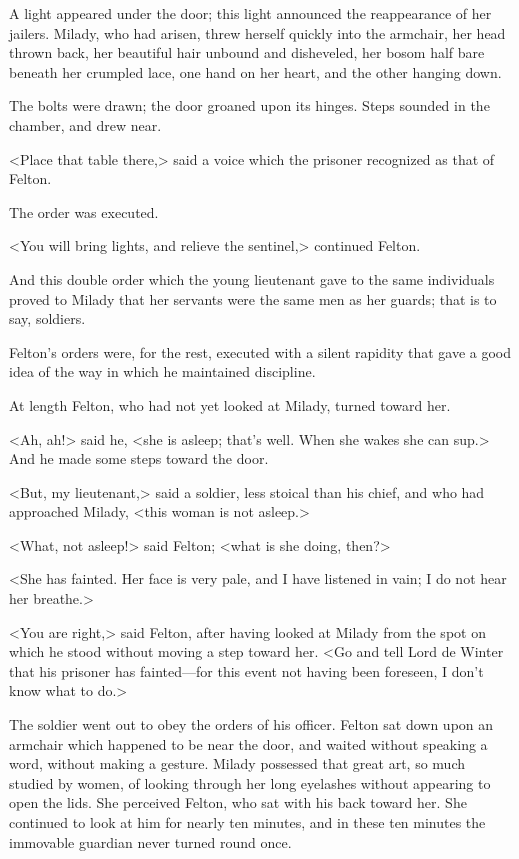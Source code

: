 A light appeared under the door; this light announced the reappearance of her jailers. Milady, who had arisen, threw herself quickly into the armchair, her head thrown back, her beautiful hair unbound and disheveled, her bosom half bare beneath her crumpled lace, one hand on her heart, and the other hanging down. 

The bolts were drawn; the door groaned upon its hinges. Steps sounded in the chamber, and drew near. 

<Place that table there,> said a voice which the prisoner recognized as that of Felton. 

The order was executed. 

<You will bring lights, and relieve the sentinel,> continued Felton. 

And this double order which the young lieutenant gave to the same individuals proved to Milady that her servants were the same men as her guards; that is to say, soldiers. 

Felton's orders were, for the rest, executed with a silent rapidity that gave a good idea of the way in which he maintained discipline. 

At length Felton, who had not yet looked at Milady, turned toward her. 

<Ah, ah!> said he, <she is asleep; that's well. When she wakes she can sup.> And he made some steps toward the door. 

<But, my lieutenant,> said a soldier, less stoical than his chief, and who had approached Milady, <this woman is not asleep.> 

<What, not asleep!> said Felton; <what is she doing, then?> 

<She has fainted. Her face is very pale, and I have listened in vain; I do not hear her breathe.> 

<You are right,> said Felton, after having looked at Milady from the spot on which he stood without moving a step toward her. <Go and tell Lord de Winter that his prisoner has fainted—for this event not having been foreseen, I don't know what to do.> 

The soldier went out to obey the orders of his officer. Felton sat down upon an armchair which happened to be near the door, and waited without speaking a word, without making a gesture. Milady possessed that great art, so much studied by women, of looking through her long eyelashes without appearing to open the lids. She perceived Felton, who sat with his back toward her. She continued to look at him for nearly ten minutes, and in these ten minutes the immovable guardian never turned round once. 

